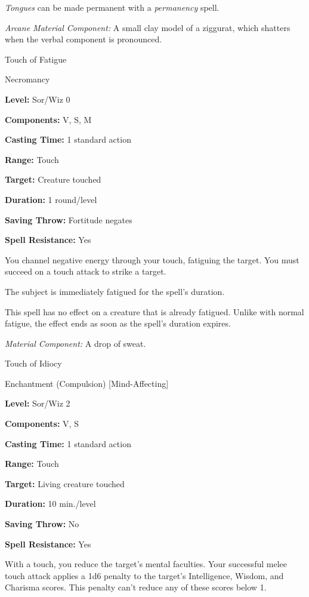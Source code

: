 \documentclass{article}
\begin{document}
\textit{Tongues }can be made permanent with a \textit{permanency }spell.

\textit{Arcane Material Component: }A small clay model of a ziggurat, which shatters 
when the verbal component is pronounced.

\vspace{12pt}
Touch of Fatigue

Necromancy

\textbf{Level:} Sor/Wiz 0

\textbf{Components:} V, S, M

\textbf{Casting Time:} 1 standard action

\textbf{Range:} Touch

\textbf{Target:} Creature touched

\textbf{Duration:} 1 round/level

\textbf{Saving Throw:} Fortitude negates

\textbf{Spell Resistance:} Yes

You channel negative energy through your touch, fatiguing the target. You must 
succeed on a touch attack to strike a target.

The subject is immediately fatigued for the spell's duration.

This spell has no effect on a creature that is already fatigued. Unlike with normal 
fatigue, the effect ends as soon as the spell's duration expires.

\textit{Material Component: }A drop of sweat.

\vspace{12pt}
Touch of Idiocy

Enchantment (Compulsion) [Mind-Affecting]

\textbf{Level:} Sor/Wiz 2

\textbf{Components:} V, S

\textbf{Casting Time:} 1 standard action

\textbf{Range:} Touch

\textbf{Target:} Living creature touched

\textbf{Duration:} 10 min./level

\textbf{Saving Throw:} No

\textbf{Spell Resistance:} Yes

With a touch, you reduce the target's mental faculties. Your successful melee touch 
attack applies a 1d6 penalty to the target's Intelligence, Wisdom, and Charisma 
scores. This penalty can't reduce any of these scores below 1.
\end{document}
